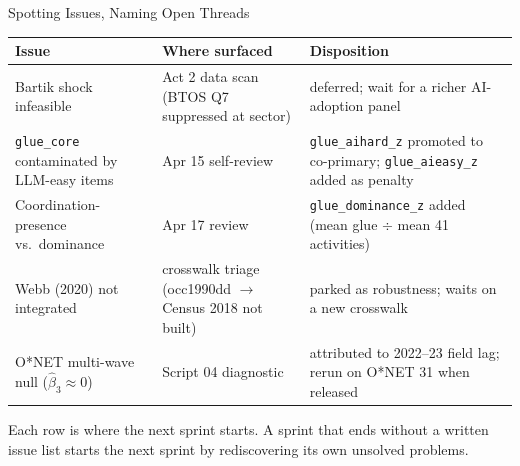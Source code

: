 \documentclass[10pt,english,aspectratio=169]{beamer}
\begin{document}
\begin{frame}{Spotting Issues, Naming Open Threads}
\scriptsize
\begin{tabular}{p{3.7cm}p{3.3cm}p{5.0cm}}
\toprule
\textbf{Issue} & \textbf{Where surfaced} & \textbf{Disposition} \\
\midrule
Bartik shock infeasible & Act 2 data scan (BTOS Q7 suppressed at sector) & deferred; wait for a richer AI-adoption panel \\
\texttt{glue\_core} contaminated by LLM-easy items & Apr 15 self-review & \texttt{glue\_aihard\_z} promoted to co-primary; \texttt{glue\_aieasy\_z} added as penalty \\
Coordination-presence vs.\ dominance & Apr 17 review & \texttt{glue\_dominance\_z} added (mean glue $\div$ mean 41 activities) \\
Webb (2020) not integrated & crosswalk triage (occ1990dd $\to$ Census 2018 not built) & parked as robustness; waits on a new crosswalk \\
O*NET multi-wave null ($\hat\beta_3\approx 0$) & Script 04 diagnostic & attributed to 2022--23 field lag; rerun on O*NET 31 when released \\
\bottomrule
\end{tabular}

\vspace{0.2cm}
\begin{tcolorbox}[colback=blue!3,colframe=RedTitle!60]\scriptsize
Each row is where the next sprint starts. A sprint that ends without a written issue list starts the next sprint by rediscovering its own unsolved problems.
\end{tcolorbox}
\end{frame}
\end{document}
